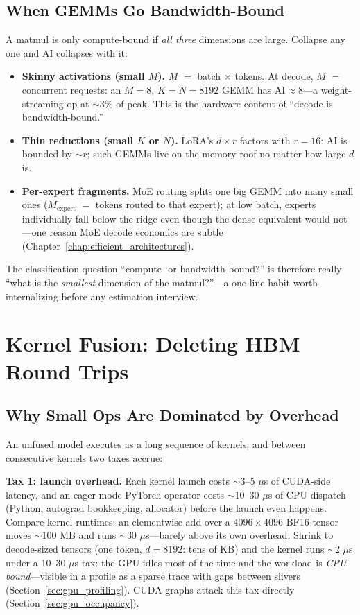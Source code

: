 \subsection{When GEMMs Go Bandwidth-Bound}

A matmul is only compute-bound if \textit{all three} dimensions are large. Collapse any one and AI collapses with it:
\begin{itemize}
    \item \textbf{Skinny activations (small $M$).} $M$ $=$ batch $\times$ tokens. At decode, $M$ $=$ concurrent requests: an $M{=}8$, $K{=}N{=}8192$ GEMM has $\text{AI} \approx 8$---a weight-streaming op at $\sim$3\% of peak. This is the hardware content of ``decode is bandwidth-bound.''
    \item \textbf{Thin reductions (small $K$ or $N$).} LoRA's $d \times r$ factors with $r{=}16$: AI is bounded by $\sim r$; such GEMMs live on the memory roof no matter how large $d$ is.
    \item \textbf{Per-expert fragments.} MoE routing splits one big GEMM into many small ones ($M_{\text{expert}}$ $=$ tokens routed to that expert); at low batch, experts individually fall below the ridge even though the dense equivalent would not---one reason MoE decode economics are subtle (Chapter~\ref{chap:efficient_architectures}).
\end{itemize}
The classification question ``compute- or bandwidth-bound?'' is therefore really ``what is the \textit{smallest} dimension of the matmul?''---a one-line habit worth internalizing before any estimation interview.

\section{Kernel Fusion: Deleting HBM Round Trips}
\label{sec:kernel_fusion}

\subsection{Why Small Ops Are Dominated by Overhead}

An unfused model executes as a long sequence of kernels, and between consecutive kernels two taxes accrue:

\textbf{Tax 1: launch overhead.} Each kernel launch costs $\sim$3--5 $\mu$s of CUDA-side latency, and an eager-mode PyTorch operator costs $\sim$10--30 $\mu$s of CPU dispatch (Python, autograd bookkeeping, allocator) before the launch even happens. Compare kernel runtimes: an elementwise add over a $4096 \times 4096$ BF16 tensor moves $\sim$100 MB and runs $\sim$30 $\mu$s---barely above its own overhead. Shrink to decode-sized tensors (one token, $d = 8192$: tens of KB) and the kernel runs $\sim$2 $\mu$s under a 10--30 $\mu$s tax: the GPU idles most of the time and the workload is \textit{CPU-bound}---visible in a profile as a sparse trace with gaps between slivers (Section~\ref{sec:gpu_profiling}). CUDA graphs attack this tax directly (Section~\ref{sec:gpu_occupancy}).

